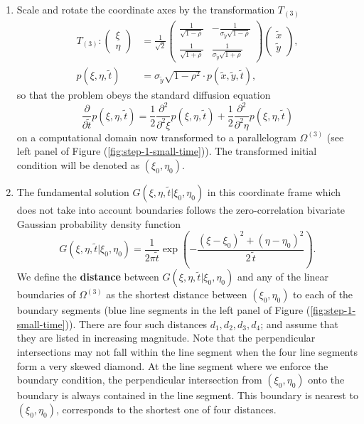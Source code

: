 \begin{enumerate}
\item Scale and rotate the coordinate axes by the transformation
  $T_{(3)}$
  \begin{align}
    T_{(3)}: \left( \begin{array}{c}
             \xi \\
             \eta
           \end{array} \right) &= \frac{1}{\sqrt{2}}
         \left( \begin{array}{cc}
                  \frac{1}{ \sqrt{1-\rho}} & -\frac{1}{\sigma_{\tilde{y}}\sqrt{1-\rho}}\\
                  \frac{1}{ \sqrt{1+\rho}} & \frac{1}{\sigma_{\tilde{y}}\sqrt{1+\rho}}
                \end{array} \right)
             \left( \begin{array}{cc}
             \tilde{x} \\
                      \tilde{y}
                    \end{array} \right), \label{eq:T3} \\
    p(\xi,\eta,\tilde{t}) &= \sigma_{\tilde{y}}\sqrt{1-\rho^2} \cdot p(\tilde{x},\tilde{y},\tilde{t}), \nonumber
       \end{align}
       so that the problem obeys the standard diffusion equation
       \[
         \frac{\partial }{\partial \tilde{t}}p(\xi,\eta,\tilde{t}) =
         \frac{1}{2}\frac{\partial^2 }{\partial^2 \xi} p(\xi,\eta,\tilde{t})+
         \frac{1}{2}\frac{\partial^2 }{\partial^2 \eta} p(\xi,\eta,\tilde{t})
       \]
       on a computational domain now transformed to a parallelogram
       $\Omega^{(3)}$ (see left panel of Figure
       (\ref{fig:step-1-small-time})). The transformed initial
       condition will be denoted as $(\xi_0, \eta_0)$.

     \item The fundamental solution
       $G(\xi,\eta,\tilde{t} | \xi_0, \eta_0)$ in this coordinate
       frame which does not take into account boundaries follows the
       zero-correlation bivariate Gaussian probability density
       function
  \[
    G(\xi,\eta,\tilde{t} | \xi_0, \eta_0) = \frac{1}{2\pi \tilde{t}} \exp\left(-\frac{(\xi-\xi_0)^2 +
        (\eta-\eta_0)^2}{2\,\tilde{t}} \right).
  \]
  We define the \textbf{distance} between
  $G(\xi,\eta,\tilde{t} | \xi_0, \eta_0)$ and any of the linear
  boundaries of $\Omega^{(3)}$ as the shortest distance between
  $(\xi_0, \eta_0)$ to each of the boundary segments (blue line
  segments in the left panel of Figure (\ref{fig:step-1-small-time})).
  There are four such distances $d_1, d_2, d_3, d_4$; and assume that
  they are listed in increasing magnitude. Note that the perpendicular
  intersections may not fall within the line segment when the four
  line segments form a very skewed diamond. At the line
  segment where we enforce the boundary condition, the perpendicular
  intersection from $(\xi_0, \eta_0)$ onto the boundary is always
  contained in the line segment. This boundary is nearest to
  $(\xi_0, \eta_0)$, corresponds to the shortest one of four
  distances.


\end{enumerate}

